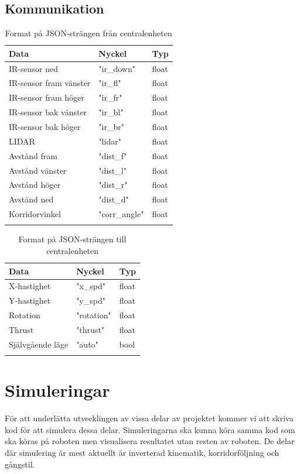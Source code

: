 \documentclass[a4paper,titlepage,12pt]{article}
\begin{document}
    \subsection{Kommunikation}

	\begin{longtable}[c]{l l l }
        \textbf{Data} & \textbf{Nyckel} & \textbf{Typ} \\ \midrule
        IR-sensor ned & "ir\_down" & float \\
        IR-sensor fram vänster & "ir\_fl" & float \\
        IR-sensor fram höger & "ir\_fr" & float \\
        IR-sensor bak vänster & "ir\_bl" & float \\
        IR-sensor bak höger & "ir\_br" & float \\
        LIDAR & "lidar" & float \\
        Avstånd fram & "dist\_f" & float \\
        Avstånd vänster & "dist\_l" & float \\
        Avstånd höger & "dist\_r" & float \\
        Avstånd ned & "dist\_d" & float \\
        Korridorvinkel & "corr\_angle" & float \\

		\caption{Format på JSON-strängen från centralenheten\label{table:guimessages}}
	\end{longtable}

	\begin{longtable}[c]{l l l }
        \textbf{Data} & \textbf{Nyckel} & \textbf{Typ} \\ \midrule
        X-hastighet & "x\_spd" & float \\
        Y-hastighet & "y\_spd" & float \\
        Rotation & "rotation" & float \\
        Thrust & "thrust" & float \\
        Självgående läge & "auto" & bool \\

		\caption{Format på JSON-strängen till centralenheten\label{table:guimessages}}
	\end{longtable}
    

    \newpage
	\section{Simuleringar}
	För att underlätta utvecklingen av vissa delar av projektet kommer vi att skriva
	kod för att simulera dessa delar. Simuleringarna ska kunna köra samma kod som ska
	köras på roboten men visualisera resultatet utan resten av roboten. De delar där 
	simulering är mest aktuellt är inverterad kinematik, korridorföljning och 
	gångstil.
\end{document}
